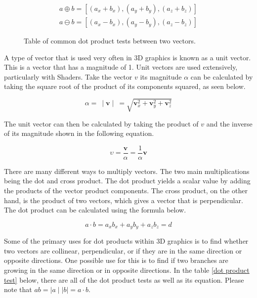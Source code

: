 \begin{equation}
\begin{aligned}
a \oplus b = [(a_x + b_x), (a_y + b_y), (a_z + b_z)]\\
a \ominus b = [(a_x - b_x), (a_y - b_y), (a_z - b_z)]
\end{aligned}
\end{equation}

\begin{figure}[htbp]
	{\centering
		\setlength{\fboxrule}{1pt}
		\vspace{7px}
		\caption{Table of common dot product tests between two vectors.}
	}
\end{figure}
\FloatBarrier

\noindent
A type of vector that is used very often in 3D graphics is known as a unit vector. This is a vector that has a magnitude of 1. Unit vectors are used extensively, particularly with \gls{Shader}s. Take the vector $v$ its magnitude $\alpha$ can be calculated by taking the square root of the product of its components squared, as seen below. 

\begin{equation}
	\alpha =~ \mid \textbf{v} \mid~ = \sqrt{\textbf{v}^2_x + \textbf{v}^2_y + \textbf{v}^2_z}
\end{equation}

The unit vector can then be calculated by taking the product of $v$ and the inverse of its magnitude shown in the following equation.

\begin{equation}
	\upsilon = \frac{\textbf{v}}{\alpha} = \frac{1}{\alpha} \textbf{v}
\end{equation}

There are many different ways to multiply vectors. The two main multiplications being the dot and cross product. The dot product yields a scalar value by adding the products of the vector product components. The cross product, on the other hand, is the product of two vectors, which gives a vector that is perpendicular. The dot product can be calculated using the formula below.

\begin{equation}
a \cdot b = a_x b_x + a_y b_y + a_z b_z = d
\end{equation}

\noindent
Some of the primary uses for dot products within 3D graphics is to find whether two vectors are collinear, perpendicular, or if they are in the same direction or opposite directions. One possible use for this is to find if two branches are growing in the same direction or in opposite directions. In the table \ref{dot product test} below, there are all of the dot product tests as well as its equation. Please note that $ab = \mid a \mid \mid b \mid = a \cdot b$.

